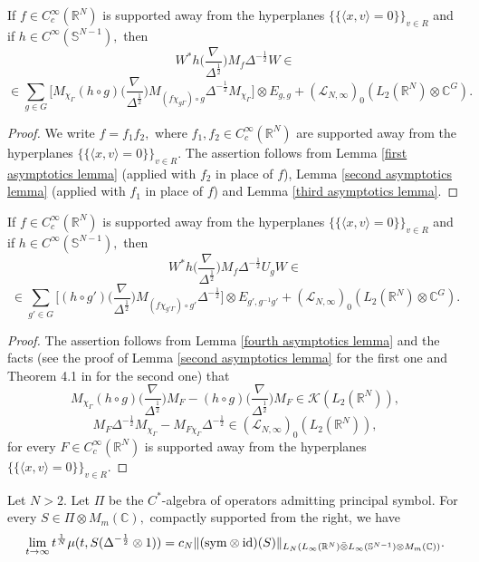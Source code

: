\documentclass{amsart}
\begin{document}
\begin{lemma}\label{fourth asymptotics lemma} If $f\in C^{\infty}_c(\mathbb{R}^N)$ is supported away from the hyperplanes $\{\{\langle x,v\rangle=0\}\}_{v\in R}$ and if
$h\in C^{\infty}(\mathbb{S}^{N-1}),$ then
$$W^{\ast}h\big(\frac{\nabla}{\Delta^{\frac12}}\big)M_f\Delta^{-\frac12}W\in$$
$$\in\sum_{g\in G}\Big[M_{\chi_{\Gamma}}(h\circ g)
\big(\frac{\nabla}{\Delta^{\frac12}}\big)M_{(f\chi_{g\Gamma})\circ g}\Delta^{-\frac12}M_{\chi_{\Gamma}}\Big]\otimes E_{g,g}+(\mathcal{L}_{N,\infty})_0(L_2(\mathbb{R}^N)\otimes\mathbb{C}^G).$$
\end{lemma}
\begin{proof} We write $f=f_1f_2,$ where $f_1,f_2\in C^{\infty}_c(\mathbb{R}^N)$ are supported away from the hyperplanes $\{\{\langle x,v\rangle=0\}\}_{v\in R}.$ The assertion follows from Lemma \ref{first asymptotics lemma} (applied with $f_2$ in place of $f$), Lemma \ref{second asymptotics lemma} (applied with $f_1$ in place of $f$) and Lemma \ref{third asymptotics lemma}.
\end{proof}

\begin{lemma}\label{fifth asymptotics lemma}
If $f\in C^{\infty}_c(\mathbb{R}^N)$ is supported away from the hyperplanes $\{\{\langle x,v\rangle=0\}\}_{v\in R}$ and if
$h\in C^{\infty}(\mathbb{S}^{N-1}),$ then
$$W^{\ast}h\big(\frac{\nabla}{\Delta^{\frac12}}\big)M_f\Delta^{-\frac12}U_gW\in$$
$$\in\sum_{g'\in G}\Big[(h\circ g')
\big(\frac{\nabla}{\Delta^{\frac12}}\big)M_{(f\chi_{g'\Gamma})\circ g'}\Delta^{-\frac12}\Big]\otimes E_{g',g^{-1}g'}+(\mathcal{L}_{N,\infty})_0(L_2(\mathbb{R}^N)\otimes\mathbb{C}^G).$$
\end{lemma}
\begin{proof} The assertion follows from Lemma \ref{fourth asymptotics lemma} and the facts (see the proof of Lemma \ref{second asymptotics lemma} for the first one and Theorem 4.1 in \cite{MR4549699} for the second one) that
$$M_{\chi_{\Gamma}}(h\circ g)
\big(\frac{\nabla}{\Delta^{\frac12}}\big)M_F-(h\circ g)\big(\frac{\nabla}{\Delta^{\frac12}}\big)
M_F\in\mathcal{K}(L_2(\mathbb{R}^N)),$$
$$M_F\Delta^{-\frac12}M_{\chi_{\Gamma}}-M_{F\chi_{\Gamma}}\Delta^{-\frac12}\in(\mathcal{L}_{N,\infty})_0(L_2(\mathbb{R}^N)),$$
for every $F\in C^{\infty}_c(\mathbb{R}^N)$ is supported away from the hyperplanes $\{\{\langle x,v\rangle=0\}\}_{v\in R}.$
\end{proof}

\begin{theorem}\label{matrix amplification asymptotics theorem} Let $N>2.$ Let $\Pi$ be the $C^{\ast}$-algebra of operators admitting principal symbol. For every $S\in\Pi\otimes M_m(\mathbb{C}),$ compactly supported from the right, we have
$$\lim_{t\to\infty}t^{\frac1N}\mu(t,S(\Delta^{-\frac12}\otimes 1))=c_N\|({\rm sym}\otimes {\rm id})(S)\|_{L_N(L_{\infty}(\mathbb{R}^N)\bar{\otimes}L_{\infty}(\mathbb{S}^{N-1})\otimes M_m(\mathbb{C}))}.$$
\end{theorem}
\end{document}
